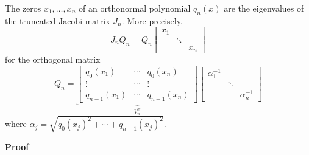 \begin{lemma} The zeros $x_1, \ensuremath{\ldots},x_n$ of an orthonormal polynomial $q_n(x)$ are the eigenvalues of the truncated Jacobi matrix $J_n$. More precisely,
\[
J_n Q_n = Q_n \begin{bmatrix} x_1 \\ & \ensuremath{\ddots} \\ && x_n \end{bmatrix}
\]
for the orthogonal matrix
\[
Q_n = \underbrace{\begin{bmatrix}
q_0(x_1) & \ensuremath{\cdots} & q_0(x_n) \\
\ensuremath{\vdots}  & \ensuremath{\cdots} & \ensuremath{\vdots}  \\
q_{n-1}(x_1) & \ensuremath{\cdots} & q_{n-1}(x_n)
\end{bmatrix}}_{V_n^\ensuremath{\top}} \begin{bmatrix} \ensuremath{\alpha}_1^{-1} \\ & \ensuremath{\ddots} \\ && \ensuremath{\alpha}_n^{-1} \end{bmatrix}
\]
where $\ensuremath{\alpha}_j = \sqrt{q_0(x_j)^2 + \ensuremath{\cdots} + q_{n-1}(x_j)^2}$.

\end{lemma}
\textbf{Proof}

